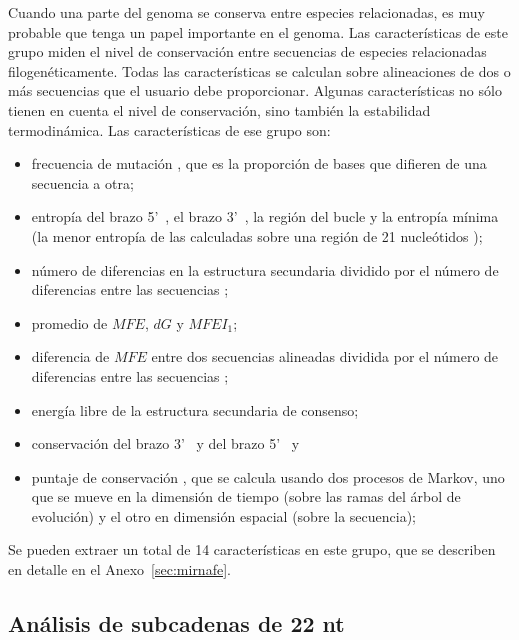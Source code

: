 Cuando una parte del genoma se conserva entre especies relacionadas, es muy probable que tenga un papel importante en el genoma. Las características de este
grupo miden el nivel de conservación entre secuencias de especies relacionadas filogenéticamente. Todas las características se calculan sobre alineaciones de
dos o más secuencias que el usuario debe proporcionar. Algunas características no sólo tienen en cuenta el nivel de conservación, sino también la estabilidad
termodinámica. Las características de ese grupo son:
\begin{itemize}
	\item frecuencia de mutación \citep{huang2007mirfinder}, que es la proporción de bases que difieren de una secuencia a otra;
	\item entropía del brazo 5\textquoteright~, el brazo 3\textquoteright~, la región del bucle y la entropía mínima (la menor entropía de las
		calculadas sobre una región de 21 nucleótidos \citep{hertel2006hairpins});
	\item número de diferencias en la estructura secundaria dividido por el número de diferencias entre las secuencias \citep{huang2007mirfinder};
	\item promedio de $MFE$, $dG$ y $MFEI_{1}$;
	\item diferencia de $MFE$ entre dos secuencias alineadas dividida por el número de diferencias entre las secuencias \citep{huang2007mirfinder};
	\item energía libre de la estructura secundaria de consenso;
	\item conservación del brazo 3\textquoteright~ y del brazo 5\textquoteright~ y
	\item puntaje de conservación \citep{terai2007mirrim}, que se calcula usando dos procesos de Markov, uno que se mueve en la dimensión de tiempo (sobre
		las ramas del árbol de evolución) y el otro en dimensión espacial (sobre la secuencia);
\end{itemize}

Se pueden extraer un total de 14 características en este grupo, que se describen en detalle en el Anexo~\ref{sec:mirnafe}.

\subsection{Análisis de subcadenas de 22 nt}


